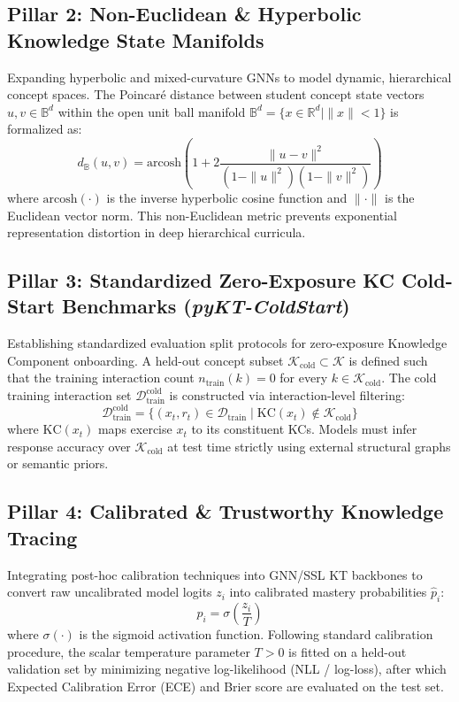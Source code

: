 \documentclass[10pt,journal,compsoc]{IEEEtran}
\begin{document}
\subsection{Pillar 2: Non-Euclidean \& Hyperbolic Knowledge State Manifolds}
Expanding hyperbolic and mixed-curvature GNNs to model dynamic, hierarchical concept spaces. The Poincaré distance between student concept state vectors $u, v \in \mathbb{B}^d$ within the open unit ball manifold $\mathbb{B}^d = \{x \in \mathbb{R}^d \mid \|x\| < 1\}$ is formalized as:
\begin{equation}
d_{\mathbb{B}}(u, v) = \text{arcosh}\left(1 + 2 \frac{\|u - v\|^2}{(1 - \|u\|^2)(1 - \|v\|^2)}\right)
\end{equation}
where $\text{arcosh}(\cdot)$ is the inverse hyperbolic cosine function and $\|\cdot\|$ is the Euclidean vector norm. This non-Euclidean metric prevents exponential representation distortion in deep hierarchical curricula.

\subsection{Pillar 3: Standardized Zero-Exposure KC Cold-Start Benchmarks (\emph{pyKT-ColdStart})}
Establishing standardized evaluation split protocols for zero-exposure Knowledge Component onboarding. A held-out concept subset $\mathcal{K}_{\text{cold}} \subset \mathcal{K}$ is defined such that the training interaction count $n_{\text{train}}(k) = 0$ for every $k \in \mathcal{K}_{\text{cold}}$. The cold training interaction set $\mathcal{D}_{\text{train}}^{\text{cold}}$ is constructed via interaction-level filtering:
\begin{equation}
\mathcal{D}_{\text{train}}^{\text{cold}} = \{(x_t, r_t) \in \mathcal{D}_{\text{train}} \mid \text{KC}(x_t) \notin \mathcal{K}_{\text{cold}}\}
\end{equation}
where $\text{KC}(x_t)$ maps exercise $x_t$ to its constituent KCs. Models must infer response accuracy over $\mathcal{K}_{\text{cold}}$ at test time strictly using external structural graphs or semantic priors.

\subsection{Pillar 4: Calibrated \& Trustworthy Knowledge Tracing}
Integrating post-hoc calibration techniques into GNN/SSL KT backbones to convert raw uncalibrated model logits $z_i$ into calibrated mastery probabilities $\hat{p}_i$:
\begin{equation}
\hat{p}_i = \sigma\left(\frac{z_i}{T}\right)
\end{equation}
where $\sigma(\cdot)$ is the sigmoid activation function. Following standard calibration procedure, the scalar temperature parameter $T > 0$ is fitted on a held-out validation set by minimizing negative log-likelihood (NLL / log-loss), after which Expected Calibration Error (ECE) and Brier score are evaluated on the test set.
\end{document}
